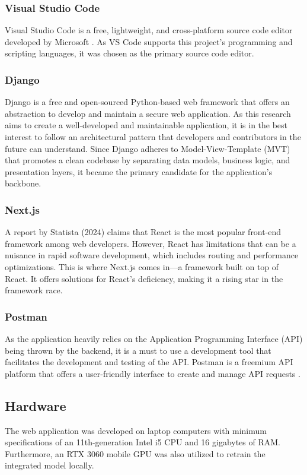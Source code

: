 \subsubsection{Visual Studio Code}
Visual Studio Code is a free, lightweight, and cross-platform source code editor developed by Microsoft \cite{vscode-2021}. As VS Code supports this project's programming and scripting languages, it was chosen as the primary source code editor.

\subsubsection{Django}
Django is a free and open-sourced Python-based web framework that offers an abstraction to develop and maintain a secure web application. As this research aims to create a well-developed and maintainable application, it is in the best interest to follow an architectural pattern that developers and contributors in the future can understand. Since Django adheres to Model-View-Template (MVT) that promotes a clean codebase by separating data models, business logic, and presentation layers, it became the primary candidate for the application's backbone. 


\subsubsection{Next.js}
A report by Statista (2024) claims that React is the most popular front-end framework among web developers. However, React has limitations that can be a nuisance in rapid software development, which includes routing and performance optimizations. This is where Next.js comes in—a framework built on top of React. It offers solutions for React's deficiency, making it a rising star in the framework race. 

\subsubsection{Postman}
As the application heavily relies on the Application Programming Interface (API) being thrown by the backend, it is a must to use a development tool that facilitates the development and testing of the API. Postman is a freemium API platform that offers a user-friendly interface to create and manage API requests \cite{postman-no-date}. 

\subsection{Hardware}
The web application was developed on laptop computers with minimum specifications of an 11th-generation Intel i5 CPU and 16 gigabytes of RAM. Furthermore, an RTX 3060 mobile GPU was also utilized to retrain the integrated model locally. 

